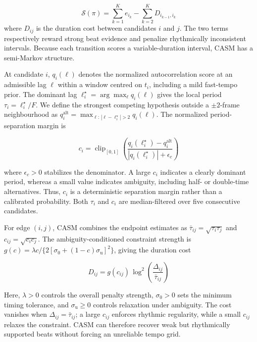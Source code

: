 \documentclass{article}
\begin{document}
\begin{equation}
\mathcal S(\pi)
=
\sum_{k=1}^{K} e_{i_k}
-
\sum_{k=2}^{K}D_{i_{k-1},i_k}
\label{eq:casm-objective}
\end{equation}
where $D_{ij}$ is the duration cost between candidates $i$ and $j$.
The two terms respectively reward strong beat evidence and penalize
rhythmically inconsistent intervals. Because each transition scores a
variable-duration interval, CASM has a semi-Markov structure.

At candidate $i$, $q_i(\ell)$ denotes the normalized
autocorrelation score at an admissible lag $\ell$ within a window
centred on $t_i$, including a mild fast-tempo prior. The dominant lag
$\ell_i^\star=\arg\max_\ell q_i(\ell)$ gives the local period
$\tau_i=\ell_i^\star/F$. We define the strongest competing hypothesis
outside a $\pm2$-frame neighbourhood as
$q_i^{\mathrm{alt}}
=\max_{\ell:\,|\ell-\ell_i^\star|>2}q_i(\ell)$.
The normalized period-separation margin is

\begin{equation}
c_i =
\operatorname{clip}_{[0,1]}\!\left(
\frac{
q_i(\ell_i^\star)-q_i^{\mathrm{alt}}
}{
|q_i(\ell_i^\star)|+\epsilon_c
}
\right)
\label{eq:casm-reliability}
\end{equation}

where $\epsilon_c>0$ stabilizes the denominator. A large $c_i$
indicates a clearly dominant period, whereas a small value indicates
ambiguity, including half- or double-time alternatives. Thus, $c_i$ is a deterministic separation margin rather than a calibrated
probability. Both $\tau_i$ and $c_i$ are median-filtered over five
consecutive candidates.

For edge $(i,j)$, CASM combines the endpoint estimates as
$\bar{\tau}_{ij}=\sqrt{\tau_i\tau_j}$ and
$c_{ij}=\sqrt{c_i c_j}$. The ambiguity-conditioned constraint strength
is
$g(c)=\lambda c/\{2[\sigma_0+(1-c)\sigma_{\mathrm u}]^2\}$,
giving the duration cost

\begin{equation}
D_{ij}
=
g(c_{ij})\,
\log^2\!\left(
\frac{\Delta_{ij}}{\bar{\tau}_{ij}}
\right)
\label{eq:casm-duration}
\end{equation}

Here, $\lambda>0$ controls the overall penalty strength,
$\sigma_0>0$ sets the minimum timing tolerance, and
$\sigma_{\mathrm u}\geq0$ controls relaxation under ambiguity.
The cost vanishes when $\Delta_{ij}=\bar{\tau}_{ij}$; a large $c_{ij}$
enforces rhythmic regularity, while a small $c_{ij}$ relaxes the
constraint. CASM can therefore recover weak but rhythmically supported beats without forcing an unreliable tempo grid.
\end{document}
